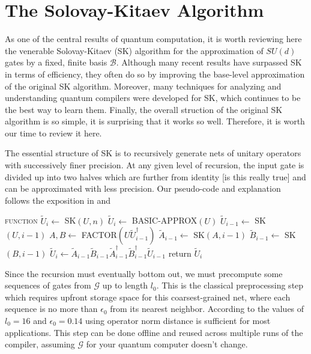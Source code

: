 \section{The Solovay-Kitaev Algorithm}
\label{sec:sk}

As one of the central results of quantum computation, it is worth
reviewing here the venerable Solovay-Kitaev (SK) algorithm for the
approximation of $SU(d)$ gates by a fixed, finite basis $\mathcal{B}$.
Although many recent results have surpassed SK in terms of efficiency,
they often do so by improving the base-level approximation of the
original SK algorithm. Moreover, many techniques for analyzing
and understanding quantum compilers were developed for SK, which
continues to be the best way to learn them. Finally, the overall
struction of the original SK algorithm is so simple, it is surprising
that it works so well. Therefore, it is worth
our time to review it here.

The essential structure of SK is to recursively generate nets of unitary
operators with
successively finer precision. At any given level of recursion, the input 
gate is divided up into two halves which are further from identity [is this
really true] and can be
approximated with less precision. Our pseudo-code and explanation
follows the exposition in \cite{Dawson2005} and \cite{harrow01}

\begin{algorithmic}[1]
\STATE \textsc{function} $\tilde{U}_i \leftarrow$ SK$(U,n)$
\STATE $\tilde{U}_i \leftarrow $ BASIC-APPROX$(U)$
\ELSE
\STATE $\tilde{U}_{i-1} \leftarrow$ SK$(U, i-1)$
\STATE $A,B \leftarrow $ FACTOR$(U\tilde{U}^\dagger_{i-1})$
\STATE $\tilde{A}_{i-1} \leftarrow $ SK$(A, i-1)$
\STATE $\tilde{B}_{i-1} \leftarrow $ SK$(B, i-1)$
\STATE $\tilde{U}_i \leftarrow \tilde{A}_{i-1}\tilde{B}_{i-1}\tilde{A}^\dagger_{i-1}\tilde{B}^\dagger_{i-1}\tilde{U}_{i-1}$
\ENDIF
\STATE return $\tilde{U}_i$
\end{algorithmic}

Since the recursion must eventually bottom out, we must precompute some sequences
of gates from $\mathcal{G}$ up to length $l_0$. This is the classical
preprocessing step which requires upfront storage space for this
coarsest-grained net, where
each sequence is no more than $\epsilon_0$ from its nearest neighbor. According
to \cite{Dawson2005} the values of $l_0=16$ and $\epsilon_0 = 0.14$ using
operator norm distance is sufficient for most applications.
This step can be
done offline and reused across multiple runs of the compiler, assuming
$\mathcal{G}$ for your quantum computer doesn't change.

